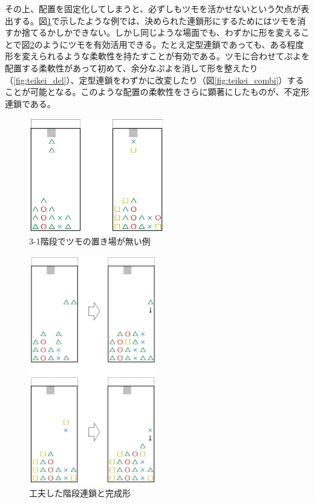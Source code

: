 \documentclass[12pt]{jarticle}
\begin{document}
その上、配置を固定化してしまうと、必ずしもツモを活かせないという欠点が表出する。図\ref{fig:kaidan_ng}で示したような例では、決められた連鎖形にするためにはツモを消すか捨てるかしかできない。しかし同じような場面でも、わずかに形を変えることで図\ref{fig:kaidan_ok}のようにツモを有効活用できる。たとえ定型連鎖であっても、ある程度形を変えられるような柔軟性を持たすことが有効である。ツモに合わせてぷよを配置する柔軟性があって初めて、余分なぷよを消して形を整えたり（\ref{fig:teikei_del}）、定型連鎖をわずかに改変したり（図\ref{fig:teikei_combi}）することが可能となる。このような配置の柔軟性をさらに顕著にしたものが、不定形連鎖である。

\begin{figure}[hbt]
  \begin{center}
  \includegraphics[height=5cm]{img/kaidan_ng.png}
  \caption{3-1階段でツモの置き場が無い例} \label{fig:kaidan_ng}
\end{center}
\end{figure}

\begin{figure}[hbt]
  \begin{center}
  \includegraphics[height=10cm]{img/kaidan_ok.png}
  \caption{工夫した階段連鎖と完成形} \label{fig:kaidan_ok}
\end{center}
\end{figure}
\end{document}

